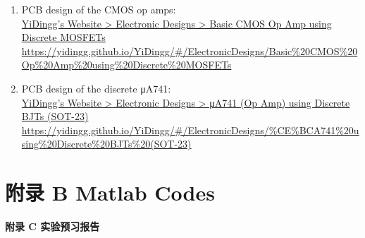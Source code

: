 \documentclass[UTF8]{article}
\begin{document}
\begin{enumerate}
\item PCB design of the CMOS op amps:
\href{https://yidingg.github.io/YiDingg/#/ElectronicDesigns/Basic\%20CMOS\%20Op\%20Amp\%20using\%20Discrete\%20MOSFETs
}{ %
\\
YiDingg's Website > Electronic Designs > Basic CMOS Op Amp using Discrete MOSFETs\\
{\color{gray}\small https://yidingg.github.io/YiDingg/\#/ElectronicDesigns/Basic\%20CMOS\%20Op\%20Amp\%20using\%20Discrete\%20MOSFETs}
}\vspace*{-5mm}
\item PCB design of the discrete  μA741:
\href{https://yidingg.github.io/YiDingg/#/ElectronicDesigns/\%CE\%BCA741\%20using\%20Discrete\%20BJTs\%20(SOT-23)
}{ %
\\
YiDingg's Website > Electronic Designs > μA741 (Op Amp) using Discrete BJTs (SOT-23)\\
{\color{gray}\small https://yidingg.github.io/YiDingg/\#/ElectronicDesigns/\%CE\%BCA741\%20using\%20Discrete\%20BJTs\%20(SOT-23)}
}


\end{enumerate}


\section*{附录 B \hspace*{20pt} Matlab Codes}
\thispagestyle{fancy} 




\newpage
\newpage
\vspace*{\fill}\begin{center}\Huge{\bfseries 
    附录 C\hspace*{20pt} 实验预习报告
}\end{center} 
\vfill
\thispagestyle{fancy} 

\end{document}
